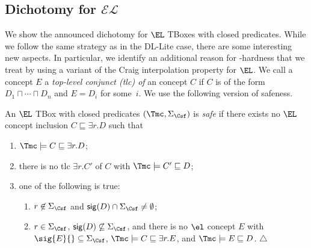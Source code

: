 \documentclass{lmcs}
\theoremstyle{definition}
\begin{document}

\subsection{Dichotomy for $\mathcal{EL}$}

We show the announced dichotomy for $\EL$ TBoxes with closed
predicates.  While we follow the same strategy as in the DL-Lite case,
there are some interesting new aspects. In particular, we identify an
additional reason for \conp-hardness that we treat by using a variant
of the Craig interpolation property for $\EL$.  We call a concept $E$
a \emph{top-level conjunct (tlc) of} an \EL concept $C$ if $C$ is of
the form $D_{1}\sqcap \cdots \sqcap D_{n}$ and $E=D_{i}$ for some~$i$.
We use the following version of safeness.

\begin{defi}
\label{def:elsafe}
  An $\EL$ TBox with closed predicates $(\Tmc,\Sigma_\Csf)$ is \emph{safe}
  if there exists no $\EL$ concept inclusion $C \sqsubseteq \exists r.D$ such
  that
  \begin{enumerate}
  \item\label{it:elsafe_ent} $\Tmc\models C \sqsubseteq \exists r.D$;
  \item\label{it:elsafe_tlc} there is no tlc $\exists r.C'$
    of $C$ with $\Tmc\models C' \sqsubseteq D$;
  \item one of the following is true:
    \begin{enumerate}
      \renewcommand{\theenumii}{(s\arabic{enumii})}
      \renewcommand{\labelenumii}{\theenumii}
    \item\label{it:el_safeness_cond1} $r\not\in\Sigma_\Csf$ and ${\sf
        sig}(D) \cap \Sigma_\Csf\not=\emptyset$;
    \item \label{it:el_safeness_cond2} $r\in \Sigma_\Csf$, ${\sf sig}(D)
      \not\subseteq\Sigma_\Csf$,
      and there is no $\el$ concept $E$ with 
      $\sig{E}{}\subseteq\Sigma_\Csf$, $\Tmc\models C \sqsubseteq 
      \exists r.E$, and $\Tmc\models E \sqsubseteq D$. \hfill$\triangle$
    \end{enumerate}
  \end{enumerate}
\end{defi}
\end{document}
